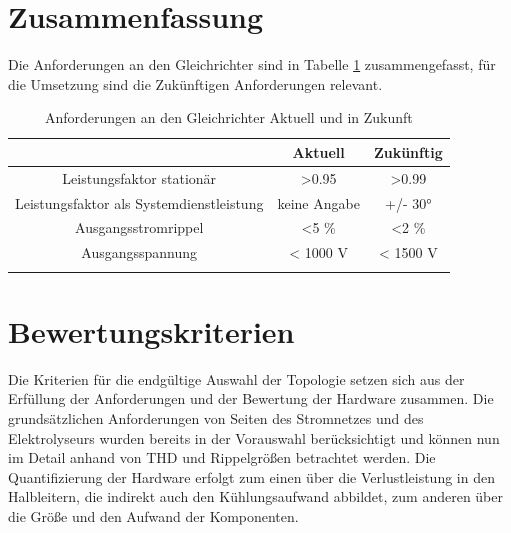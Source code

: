 \section{Zusammenfassung}
Die Anforderungen an den Gleichrichter sind in Tabelle \ref{tab:AnfZsm} zusammengefasst, für die Umsetzung sind die Zukünftigen Anforderungen relevant.\\
\begin{table}
\caption{Anforderungen an den Gleichrichter Aktuell und in Zukunft}

\begin{tabular}{c|c|c}
	
	& Aktuell & Zukünftig \\
	\hline
	Leistungsfaktor stationär & >0.95 & >0.99 \\
	\hline
	Leistungsfaktor als Systemdienstleistung & keine Angabe & +/- 30° \\
	\hline
	Ausgangsstromrippel & <5 \% & <2 \% \\
	\hline
	Ausgangsspannung & < 1000 V & < 1500 V \\
	
	
	\label{tab:AnfZsm}
\end{tabular}
\end{table}
\section{Bewertungskriterien}
Die Kriterien für die endgültige Auswahl der Topologie setzen sich aus der Erfüllung der Anforderungen und der Bewertung der Hardware zusammen. Die grundsätzlichen Anforderungen von Seiten des Stromnetzes und des Elektrolyseurs wurden bereits in der Vorauswahl berücksichtigt und können nun im Detail anhand von \gls{THD} und Rippelgrößen betrachtet werden. Die Quantifizierung der Hardware erfolgt zum einen über die Verlustleistung in den Halbleitern, die indirekt auch den Kühlungsaufwand abbildet, zum anderen über die Größe und den Aufwand der Komponenten.  